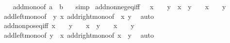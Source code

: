 \begin{isabellebody}
%
\isadelimproof
\ \ %
\endisadelimproof
%
\isatagproof
{}\isamarkupfalse%
\ add{\isacharunderscore}{\kern0pt}mono{\isacharbrackleft}{\kern0pt}of\ a\ {}\ b\ {}{\isacharbrackright}{\kern0pt}\ \isamarkupfalse%
\ simp%
\endisatagproof
{\isafoldproof}%
%
\isadelimproof
\isanewline
%
\endisadelimproof
\isanewline
{}\isamarkupfalse%
\ add{\isacharunderscore}{\kern0pt}nonneg{\isacharunderscore}{\kern0pt}eq{\isacharunderscore}{\kern0pt}{}{\isacharunderscore}{\kern0pt}iff{\isacharcolon}{\kern0pt}\ {\isachardoublequoteopen}{}\ {\isasymle}\ x\ {\isasymLongrightarrow}\ {}\ {\isasymle}\ y\ {\isasymLongrightarrow}\ x\ {\isacharplus}{\kern0pt}\ y\ {\isacharequal}{\kern0pt}\ {}\ {\isasymlongleftrightarrow}\ x\ {\isacharequal}{\kern0pt}\ {}\ {\isasymand}\ y\ {\isacharequal}{\kern0pt}\ {}{\isachardoublequoteclose}\isanewline
%
\isadelimproof
\ \ %
\endisadelimproof
%
\isatagproof
{}\isamarkupfalse%
\ add{\isacharunderscore}{\kern0pt}left{\isacharunderscore}{\kern0pt}mono{\isacharbrackleft}{\kern0pt}of\ {}\ y\ x{\isacharbrackright}{\kern0pt}\ add{\isacharunderscore}{\kern0pt}right{\isacharunderscore}{\kern0pt}mono{\isacharbrackleft}{\kern0pt}of\ {}\ x\ y{\isacharbrackright}{\kern0pt}\ \isamarkupfalse%
\ auto%
\endisatagproof
{\isafoldproof}%
%
\isadelimproof
\isanewline
%
\endisadelimproof
\isanewline
{}\isamarkupfalse%
\ add{\isacharunderscore}{\kern0pt}nonpos{\isacharunderscore}{\kern0pt}eq{\isacharunderscore}{\kern0pt}{}{\isacharunderscore}{\kern0pt}iff{\isacharcolon}{\kern0pt}\ {\isachardoublequoteopen}x\ {\isasymle}\ {}\ {\isasymLongrightarrow}\ y\ {\isasymle}\ {}\ {\isasymLongrightarrow}\ x\ {\isacharplus}{\kern0pt}\ y\ {\isacharequal}{\kern0pt}\ {}\ {\isasymlongleftrightarrow}\ x\ {\isacharequal}{\kern0pt}\ {}\ {\isasymand}\ y\ {\isacharequal}{\kern0pt}\ {}{\isachardoublequoteclose}\isanewline
%
\isadelimproof
\ \ %
\endisadelimproof
%
\isatagproof
{}\isamarkupfalse%
\ add{\isacharunderscore}{\kern0pt}left{\isacharunderscore}{\kern0pt}mono{\isacharbrackleft}{\kern0pt}of\ y\ {}\ x{\isacharbrackright}{\kern0pt}\ add{\isacharunderscore}{\kern0pt}right{\isacharunderscore}{\kern0pt}mono{\isacharbrackleft}{\kern0pt}of\ x\ {}\ y{\isacharbrackright}{\kern0pt}\ \isamarkupfalse%
\ auto%
\endisatagproof
{\isafoldproof}%
%
\isadelimproof
\isanewline

\end{isabellebody}

